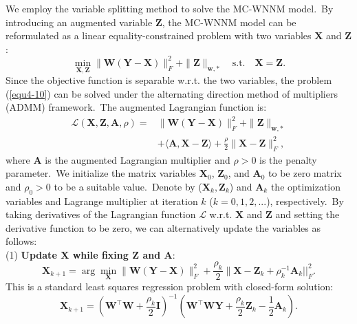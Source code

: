 We employ the variable splitting method \cite{courant1943,Eckstein1992} to solve the MC-WNNM model.\ By introducing an augmented variable $\mathbf{Z}$, the MC-WNNM model can be reformulated as a linear equality-constrained problem with two variables $\mathbf{X}$ and $\mathbf{Z}$:
\begin{equation}
\label{equ4-10}
\min_{\mathbf{X},\mathbf{Z}}\|\mathbf{W}(\mathbf{Y}-\mathbf{X})\|_{F}^{2}
+
\|\mathbf{Z}\|_{\bm{w},*}
\quad
\text{s.t.}
\quad
\mathbf{X}=\mathbf{Z}.
\end{equation}
Since the objective function is separable w.r.t. the two variables, the problem (\ref{equ4-10}) can be solved under the alternating direction method of multipliers (ADMM) \cite{admm} framework.\ The augmented Lagrangian function is:
\begin{equation}
\label{equ4-11}
\begin{split}
\mathcal{L}(\mathbf{X},\mathbf{Z},\mathbf{A},\rho)
=
&\|\mathbf{W}(\mathbf{Y}-\mathbf{X})\|_{F}^{2}
+
\|\mathbf{Z}\|_{\bm{w},*}
\\
&
+
\langle
\mathbf{A},\mathbf{X}-\mathbf{Z}
\rangle
+
\frac{\rho}{2}
\|\mathbf{X}-\mathbf{Z}\|_{F}^{2},
\end{split}
\end{equation}
where $\mathbf{A}$ is the augmented Lagrangian multiplier and $\rho>0$ is the penalty parameter.\ We initialize the matrix variables $\mathbf{X}_{0}$, $\mathbf{Z}_{0}$, and $\mathbf{A}_{0}$ to be zero matrix and $\rho_{0}>0$ to be a suitable value.\ Denote by ($\mathbf{X}_{k}, \mathbf{Z}_{k}$) and $\mathbf{A}_{k}$ the optimization variables and Lagrange multiplier at iteration $k$ ($k=0,1,2,...$), respectively.\ By taking derivatives of the Lagrangian function $\mathcal{L}$ w.r.t. $\mathbf{X}$ and $\mathbf{Z}$ and setting the derivative function to be zero, we can alternatively update the variables as follows:
\\
(1) \textbf{Update $\mathbf{X}$ while fixing $\mathbf{Z}$ and $\mathbf{A}$}:
\begin{equation}
\label{equ4-12}
\mathbf{X}_{k+1}
=
\arg\min_{\mathbf{X}}
\|\mathbf{W}(\mathbf{Y}-\mathbf{X})\|_{F}^{2} 
+
\frac{\rho_{k}}{2}\|\mathbf{X} - \mathbf{Z}_{k} + \rho_{k}^{-1}\mathbf{A}_{k}||_{F}^{2}.
\end{equation}
This is a standard least squares regression problem with closed-form solution:
\begin{equation}
\label{equ4-13}
\mathbf{X}_{k+1}
=
(\mathbf{W}^{\top}\mathbf{W}+\frac{\rho_{k}}{2}\mathbf{I})^{-1}
(\mathbf{W}^{\top}\mathbf{W}\mathbf{Y} + \frac{\rho_{k}}{2}\mathbf{Z}_{k} -\frac{1}{2}\mathbf{A}_{k}).
\end{equation}
